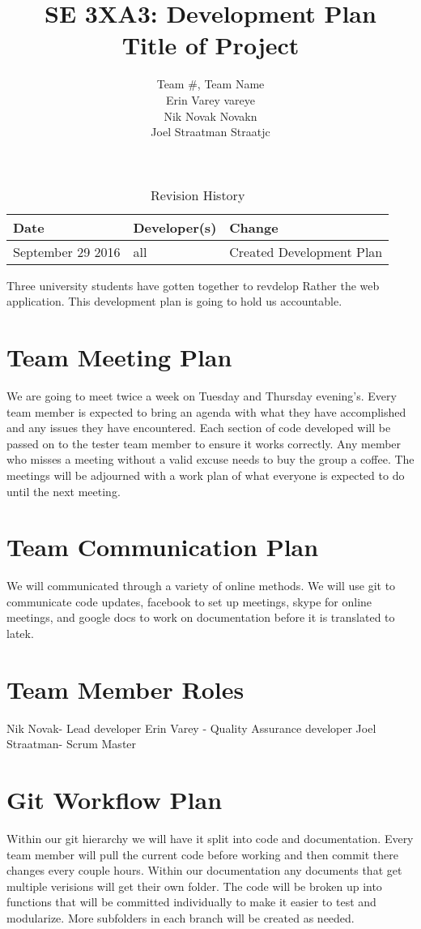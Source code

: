 \documentclass{article}
\title{SE 3XA3: Development Plan\\Title of Project}
\author{Team \#, Team Name
		\\ Erin Varey vareye
		\\ Nik Novak Novakn
		\\ Joel Straatman Straatjc
}
\date{}
\begin{document}
\begin{table}[hp]
\caption{Revision History} \label{TblRevisionHistory}
\begin{tabularx}{\textwidth}{llX}
\toprule
\textbf{Date} & \textbf{Developer(s)} & \textbf{Change}\\
\midrule
September 29 2016 & all & Created Development Plan\\

\bottomrule
\end{tabularx}
\end{table}
\newpage
\maketitle
Three university students have gotten together to revdelop Rather the web application. 
This development plan is going to hold us accountable. 
\section{Team Meeting Plan}
We are going to meet twice a week on Tuesday and Thursday evening's. 
Every team member is expected to bring an agenda with what they have accomplished and any issues they have encountered. 
Each section of code developed will be passed on to the tester team member to ensure it works correctly. 
Any member who misses a meeting without a valid excuse needs to buy the group a coffee. 
The meetings will be adjourned with a work plan of what everyone is expected to do until the next meeting.
\section{Team Communication Plan}
We will communicated through a variety of online methods.
We will use git to communicate code updates, facebook to set up meetings, skype for online meetings, and google docs to work on documentation before it is translated to latek.
\section{Team Member Roles}
Nik Novak- Lead developer
Erin Varey - Quality Assurance developer
Joel Straatman- Scrum Master
\section{Git Workflow Plan}
Within our git hierarchy we will have it split into code and documentation.
Every team member will pull the current code before working and then commit there changes every couple hours.
Within our documentation any documents that get multiple verisions will get their own folder.
The code will be broken up into functions that will be committed individually to make it easier to test and modularize. 
More subfolders in each branch will be created as needed.
\end{document}
